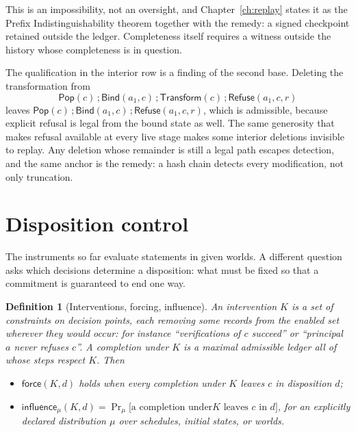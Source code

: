 \documentclass[11pt,openany]{book}
\newtheorem{definition}[theorem]{Definition}
\theoremstyle{remark}
\newcommand{\Pop}{\mathsf{Pop}}
\newcommand{\Refuse}{\mathsf{Refuse}}
\newcommand{\Bind}{\mathsf{Bind}}
\newcommand{\Transform}{\mathsf{Transform}}
\begin{document}
This is an impossibility, not an oversight, and Chapter~\ref{ch:replay}
states it as the Prefix Indistinguishability theorem together with the
remedy: a signed checkpoint retained outside the ledger. Completeness
itself requires a witness outside the history whose completeness is in
question.

The qualification in the interior row is a finding of the second base.
Deleting the transformation from
\[
\Pop(c)\,;\Bind(a_1,c)\,;\Transform(c)\,;\Refuse(a_1,c,r)
\]
leaves $\Pop(c)\,;\Bind(a_1,c)\,;\Refuse(a_1,c,r)$, which is admissible,
because explicit refusal is legal from the bound state as well. The same
generosity that makes refusal available at every live stage makes some
interior deletions invisible to replay. Any deletion whose remainder is
still a legal path escapes detection, and the same anchor is the remedy:
a hash chain detects every modification, not only truncation.

\section{Disposition control}
\label{sec:control}

The instruments so far evaluate statements in given worlds. A different
question asks which decisions determine a disposition: what must be fixed
so that a commitment is guaranteed to end one way.

\begin{definition}[Interventions, forcing, influence]
An \emph{intervention} $K$ is a set of constraints on decision points,
each removing some records from the enabled set wherever they would occur:
for instance ``verifications of $c$ succeed'' or ``principal $a$ never
refuses $c$''. A \emph{completion} under $K$ is a maximal admissible
ledger all of whose steps respect $K$. Then
\begin{itemize}[leftmargin=1.5em]
\item $\mathsf{force}(K,d)$ holds when \emph{every} completion under $K$
leaves $c$ in disposition $d$;
\item $\mathsf{influence}_\mu(K,d)=\Pr_\mu\bigl[\text{a completion under
$K$ leaves $c$ in }d\bigr]$, for an explicitly declared distribution $\mu$
over schedules, initial states, or worlds.
\end{itemize}
\end{definition}
\end{document}
